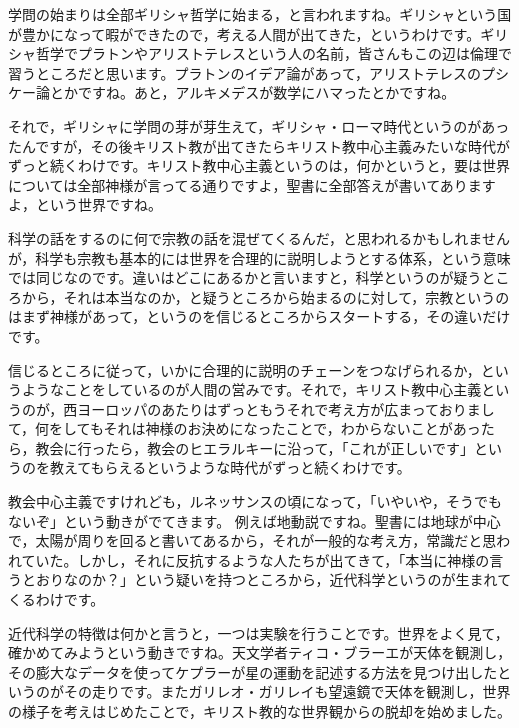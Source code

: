 \documentclass{ltjsbook}
\begin{document}
学問の始まりは全部ギリシャ哲学に始まる，と言われますね。ギリシャという国が豊かになって暇ができたので，考える人間が出てきた，というわけです。ギリシャ哲学でプラトンやアリストテレスという人の名前，皆さんもこの辺は倫理で習うところだと思います。プラトンのイデア論があって，アリストテレスのプシケー論とかですね。あと，アルキメデスが数学にハマったとかですね。

それで，ギリシャに学問の芽が芽生えて，ギリシャ・ローマ時代というのがあったんですが，その後キリスト教が出てきたらキリスト教中心主義みたいな時代がずっと続くわけです。キリスト教中心主義というのは，何かというと，要は世界については全部神様が言ってる通りですよ，聖書に全部答えが書いてありますよ，という世界ですね。

科学の話をするのに何で宗教の話を混ぜてくるんだ，と思われるかもしれませんが，科学も宗教も基本的には世界を合理的に説明しようとする体系，という意味では同じなのです。違いはどこにあるかと言いますと，科学というのが疑うところから，それは本当なのか，と疑うところから始まるのに対して，宗教というのはまず神様があって，というのを信じるところからスタートする，その違いだけです。

信じるところに従って，いかに合理的に説明のチェーンをつなげられるか，というようなことをしているのが人間の営みです。それで，キリスト教中心主義というのが，西ヨーロッパのあたりはずっともうそれで考え方が広まっておりまして，何をしてもそれは神様のお決めになったことで，わからないことがあったら，教会に行ったら，教会のヒエラルキーに沿って，「これが正しいです」というのを教えてもらえるというような時代がずっと続くわけです。

教会中心主義ですけれども，ルネッサンスの頃になって，「いやいや，そうでもないぞ」という動きがでてきます。
例えば地動説ですね。聖書には地球が中心で，太陽が周りを回ると書いてあるから，それが一般的な考え方，常識だと思われていた。しかし，それに反抗するような人たちが出てきて，「本当に神様の言うとおりなのか？」という疑いを持つところから，近代科学というのが生まれてくるわけです。

近代科学の特徴は何かと言うと，一つは実験を行うことです。世界をよく見て，確かめてみようという動きですね。天文学者ティコ・ブラーエが天体を観測し，その膨大なデータを使ってケプラーが星の運動を記述する方法を見つけ出したというのがその走りです。またガリレオ・ガリレイも望遠鏡で天体を観測し，世界の様子を考えはじめたことで，キリスト教的な世界観からの脱却を始めました。
\end{document}
